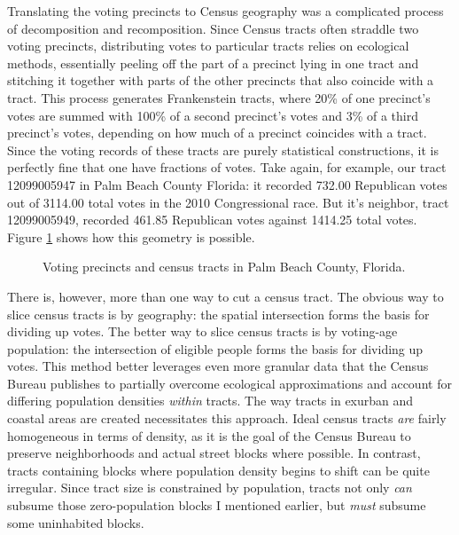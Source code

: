\documentclass[12pt,oneside]{psthesis}
\begin{document}
Translating the voting precincts to Census geography was a complicated process of decomposition and recomposition.
Since Census tracts often straddle two voting precincts, distributing votes to particular tracts relies on ecological methods, essentially peeling off the part of a precinct lying in one tract and stitching it together with parts of the other precincts that also coincide with a tract.
This process generates Frankenstein tracts, where 20\% of one precinct's votes are summed with 100\% of a second precinct's votes and 3\% of a third precinct's votes, depending on how much of a precinct coincides with a tract.
Since the voting records of these tracts are purely statistical constructions, it is perfectly fine that one have fractions of votes.
Take again, for example, our tract 12099005947 in Palm Beach County Florida: it recorded 732.00 Republican votes out of 3114.00 total votes in the 2010 Congressional race.
But it's neighbor, tract 12099005949, recorded 461.85 Republican votes against 1414.25 total votes.
Figure \ref{fig:palmbeach} shows how this geometry is possible.
\begin{figure}

{\centering {}

}

\caption{Voting precincts and census tracts in Palm Beach County, Florida.}\label{fig:palmbeach}
\end{figure}
There is, however, more than one way to cut a census tract.
The obvious way to slice census tracts is by geography: the spatial intersection forms the basis for dividing up votes.
The better way to slice census tracts is by voting-age population: the intersection of eligible people forms the basis for dividing up votes.
This method better leverages even more granular data that the Census Bureau publishes to partially overcome ecological approximations and account for differing population densities \emph{within} tracts.
The way tracts in exurban and coastal areas are created necessitates this approach.
Ideal census tracts \emph{are} fairly homogeneous in terms of density, as it is the goal of the Census Bureau to preserve neighborhoods and actual street blocks where possible.
In contrast, tracts containing blocks where population density begins to shift can be quite irregular.
Since tract size is constrained by population, tracts not only \emph{can} subsume those zero-population blocks I mentioned earlier, but \emph{must} subsume some uninhabited blocks.
\end{document}

